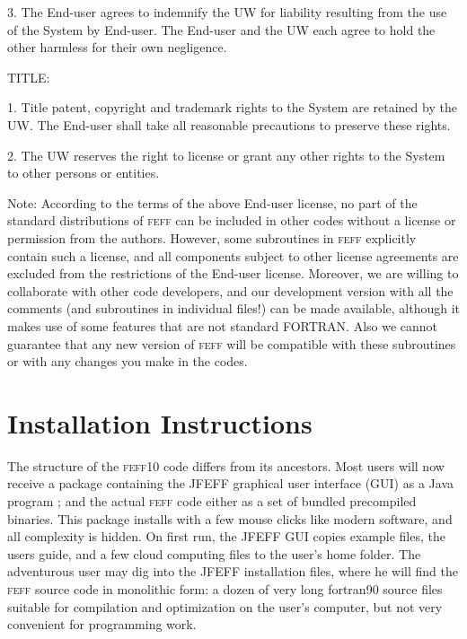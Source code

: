 \documentclass[11pt,oneside]{report} %
\newcommand{\program}[1]{\textsc{#1}}
\newcommand{\feff}{\program{feff}}
\newcommand{\vnum}{10}
\newcommand{\feffcur}{\feff\vnum}
\begin{document}
\begin{latexonly}
 3. The End-user agrees to indemnify the UW for liability resulting
 from the use of the System by End-user. The End-user and the UW each
 agree to hold the other harmless for their own negligence.

 TITLE:

 1. Title patent, copyright and trademark rights to the System are
 retained by the UW. The End-user shall take all reasonable precautions
 to preserve these rights.

 2. The UW reserves the right to license or grant any other rights to
 the System to other persons or entities.


Note: According to the terms of the above End-user license, 
no part of the standard distributions of {\feff} can be included in other
codes without a license or permission from the authors. However, some subroutines
in {\feff} explicitly contain such a license, and all components subject to
other license agreements are excluded from the restrictions of the
End-user license. Moreover, we are willing to collaborate with other code
developers, and our development version with all the
comments (and subroutines in individual files!) can be made available,
although it makes use of some features that are not standard FORTRAN.
Also we cannot guarantee that any new version of {\feff} will be compatible 
with these subroutines or with any changes you make in the codes.




\chapter{Installation Instructions}
\label{sec:Append-B-Inst}
The structure of the {\feffcur} code differs from its ancestors.
Most users will now receive a package containing the JFEFF graphical user interface (GUI) as a Java program ; and the actual {\feff} code either as a set of bundled precompiled binaries.  This package installs with a few mouse clicks like modern software, and all complexity is hidden.  On first run, the JFEFF GUI copies example files, the users guide, and a few cloud computing files to the user's home folder.  The adventurous user may dig into the JFEFF installation files, where he will find the {\feff} source code in monolithic form: a dozen of very long fortran90 source files suitable for compilation and optimization on the user's computer, but not very convenient for programming work.


\end{latexonly}
\end{document}
